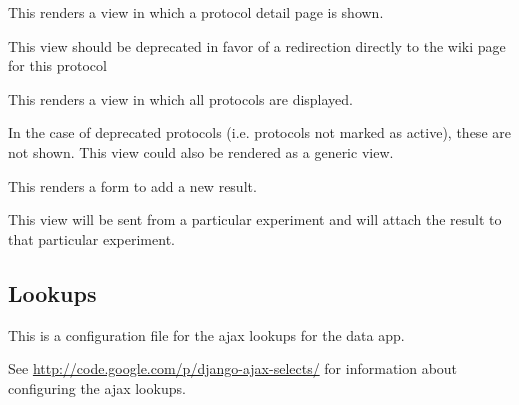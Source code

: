 \documentclass[letterpaper,10pt,english]{sphinxmanual}
\begin{document}

\begin{fulllineitems}
\label{api:experimentdb.data.views.protocol_detail}
This renders a view in which a protocol detail page is shown.


This view should be deprecated in favor of a redirection directly to the wiki page for this protocol


\end{fulllineitems}


\begin{fulllineitems}
\label{api:experimentdb.data.views.protocol_list}
This renders a view in which all protocols are displayed.


In the case of deprecated protocols (i.e. protocols not marked as active), these are not shown.  This view could also be rendered as a generic view.


\end{fulllineitems}


\begin{fulllineitems}
\label{api:experimentdb.data.views.result_new}
This renders a form to add a new result.


This view will be sent from a particular experiment and will attach the result to that particular experiment.


\end{fulllineitems}



\subsection{Lookups}
\label{api:lookups}\label{api:module-experimentdb.data.lookups}
This is a configuration file for the ajax lookups for the data app.


See \href{http://code.google.com/p/django-ajax-selects/}{http://code.google.com/p/django-ajax-selects/} for information about configuring the ajax lookups.
\end{document}
